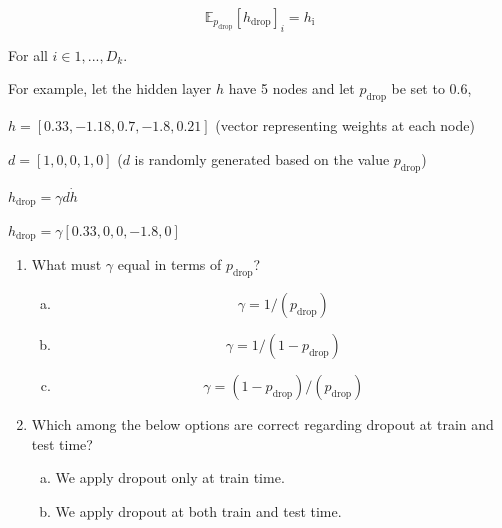 \begin{enumerate}[1.]
\begin{equation*}
   \mathbb{E}_{p_{\text{drop}}}[h_\text{drop}]_i = h_{\text{i}}
\end{equation*}

For all $i \in {1,...,D_k}$.

For example, let the hidden layer $h$ have 5 nodes and let $p_\text{drop}$ be set to 0.6,

$h = [0.33, -1.18, 0.7, -1.8, 0.21]$ (vector representing weights at each node)

$d = [1, 0, 0, 1, 0]$  ($d$ is randomly generated based on the value $p_\text{drop}$)

$h_\text{drop} = \gamma d\dot h$

$h_\text{drop} = \gamma [0.33, 0, 0, -1.8, 0]$

\begin{enumerate}[3a.]

\item {} What must $\gamma$ equal in terms of $p_\text{drop}$?

\begin{enumerate}[(a)]
\item \begin{equation*}\gamma = 1 / (p_{\text{drop}})\end{equation*}
\item \begin{equation*}\gamma = 1 / (1 - p_{\text{drop}})\end{equation*}
\item \begin{equation*}\gamma = (1 - p_{\text{drop}}) / (p_{\text{drop}})\end{equation*}
\end{enumerate}


\item {} Which among the below options are correct regarding dropout at train and test time?

\begin{enumerate}[(a)]
\item We apply dropout only at train time.
\item We apply dropout at both train and test time.
\end{enumerate}


\end{enumerate}


\end{enumerate}
